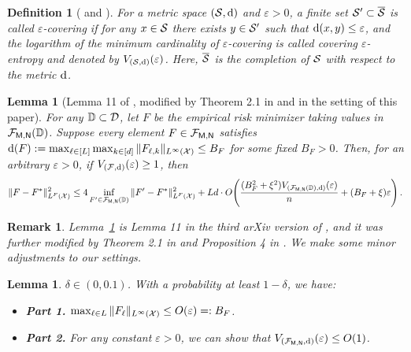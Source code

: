 \documentclass[11pt]{article}
\let\citet\citep
\theoremstyle{plain}
\newtheorem{lemma}[theorem]{Lemma}
\newtheorem{definition}[theorem]{Definition}
\newtheorem{remark}[theorem]{Remark}
\begin{document}
\begin{definition}[\citealp{vw96} and \citealp{yb99}]
    For a metric space $({\cal S}, {\rm d})$ and $\varepsilon > 0$, a finite set ${\cal S}' \subset \overline{\cal S}$ is called $\varepsilon$-covering if for any $x \in {\cal S}$ there exists $y \in {\cal S}'$ such that ${\rm d}(x, y) \leq \varepsilon$, and the logarithm of the minimum cardinality of $\varepsilon$-covering is called covering $\varepsilon$-entropy and denoted by $V_{({\cal S}, {\rm d})}(\varepsilon)$. Here, $\overline{\cal S}$ is the completion of ${\cal S}$ with respect to the metric ${\rm d}$.
\end{definition}

\begin{lemma}[Lemma 11 of \citealp{sch17}, modified by Theorem 2.1 in \citealp{sat17} and in the setting of this paper]\label{thm:gen}
    For any $\mathbb{D} \subset {\cal D}$, let $F$ be the empirical risk minimizer taking values in ${\cal F}_{\sf M, N}(\mathbb{D})$. 
    Suppose every element $F \in {\cal F}_{\sf M, N}$ satisfies ${\rm d}(F) := \max_{\ell \in [L]} \max_{k \in [d]}  \| F_{\ell, k} \|_{L^{\infty}({\cal X})} \leq B_F$ for some fixed $B_F > 0$. Then, for an arbitrary $\varepsilon > 0$, if $V_{({\cal F}, {\rm d})}(\varepsilon) \ge 1$, then
    \begin{align*}
        \| F - F^* \|_{L^F({\cal X})}^2 \leq 4 \inf_{F' \in {\cal F}_{\sf M, N}(\mathbb{D})} \| F' - F^* \|_{L^F({\cal X})}^2 + Ld \cdot O\!\left( \frac{(B_F^2+\xi^2)V_{({\cal F}_{\sf M, N}(\mathbb{D}), {\rm d})}(\varepsilon)}{n} + (B_F+\xi)\varepsilon\right).
    \end{align*}
\end{lemma}

\begin{remark}
    Lemma~\ref{thm:gen} is Lemma 11 in the third arXiv version of \citet{sch17}, and it was further modified by Theorem 2.1 in \citet{sat17} and Proposition 4 in \citet{suz18}. We make some minor adjustments to our settings.
\end{remark}


\begin{lemma}\label{lem:generalization_helper}
    $\delta \in (0, 0.1)$. With a probability at least $1 - \delta$, we have:
    \begin{itemize}
        \item {\bf Part 1.} $\max_{\ell \in L}  \| F_{\ell} \|_{L^{\infty}({\cal X})} \leq O(\varepsilon) =: B_F$.
        \item {\bf Part 2.} For any constant $\varepsilon > 0$, we can show that $ V_{({\cal F}_{\sf M, N}, {\rm d})}(\varepsilon) \leq O(1)$.
    \end{itemize}
\end{lemma}
\end{document}
